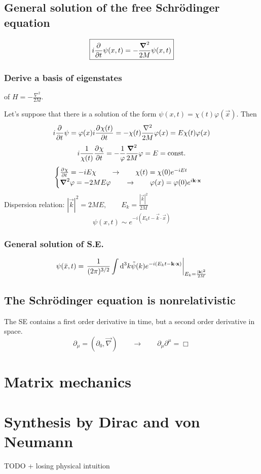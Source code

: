 \subsection{General solution of the free Schrödinger equation}
\[ \boxed{i  \frac{\partial{^{}}}{\partial{{t}^{}}} \psi(x,t) = -\frac{\boldsymbol{\mathrm{\nabla}}^2}{2M}\psi(x,t)} \]
\subsubsection{Derive a basis of eigenstates} of $H = - \frac{\nabla^2}{2M}$.\par
Let's suppose that there is a solution of the form $\psi(x,t) = \chi(t)\varphi(\vec{x})$. Then
\[ i  \frac{\partial{^{}}}{\partial{{t}^{}}} \psi = \varphi(x)i  \frac{\partial{^{}}\chi(t)}{\partial{{t}^{}}}  = -\chi(t) \frac{\nabla^2}{2M}\varphi(x) = E\chi(t)\varphi(x) \]
\[ i \frac{1}{\chi(t)} \frac{\partial{^{}}\chi}{\partial{{t}^{}}}  = - \frac{1}{\varphi}\frac{\boldsymbol{\mathrm{\nabla}}^2}{2M}\varphi = E = \text{const.} \]
\[ \begin{cases}
 \frac{\partial{^{}}\chi}{\partial{{t}^{}}}  = -iE\chi \qquad \to \qquad \chi(t) = \chi(0)e^{-iEt} \\
\boldsymbol{\mathrm{\nabla}}^2\varphi = -2ME\varphi \qquad \to \qquad \varphi(x) = \varphi(0)e^{i \boldsymbol{\mathrm{k}}\cdot\boldsymbol{\mathrm{x}}}
\end{cases} \]
Dispersion relation: $\left|\vec{k}\right|^2 = 2ME, \qquad E_k = \frac{\left|\vec{k}\right|^2}{2M}$
\[ \psi(x,t) \sim e^{-i(E_kt - \vec{k}\cdot\vec{x})} \]
\subsubsection{General solution of S.E.}
\[ \psi(\bar{x},t) = \left.\frac{1}{(2\pi)^{3/2}}\int \operatorname{d \!}{^3k}\tilde{\psi}(k)e^{-i(E_kt- \boldsymbol{\mathrm{k}}\cdot \boldsymbol{\mathrm{x}})}\right|_{E_k = \frac{|\boldsymbol{\mathrm{k}}|^2}{2M}} \]
\subsection{The Schrödinger equation is nonrelativistic}
The SE contains a first order derivative in time, but a second order derivative in space.
\[ \partial_\mu = (\partial_0, \vec{\nabla}) \qquad \to \qquad \partial_\mu\partial^\mu = \Box \]

\section{Matrix mechanics}

\section{Synthesis by Dirac and von Neumann}
TODO + losing physical intuition

